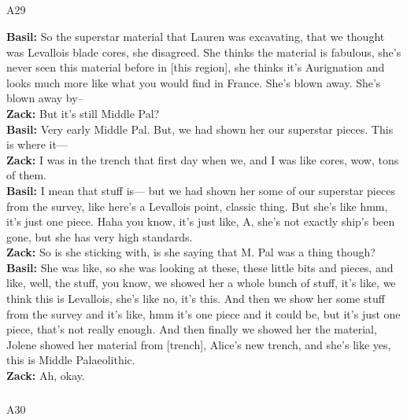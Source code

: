 \documentclass[
  canadian,
]{article}
\makeatletter
\let\oldsubparagraph\subparagraph
\renewcommand{\subparagraph}{
    \@ifstar
      \xxxSubParagraphStar
      \xxxSubParagraphNoStar
  }
\newcommand{\xxxSubParagraphStar}[1]{\oldsubparagraph*{#1}\mbox{}}
\newcommand{\xxxSubParagraphNoStar}[1]{\oldsubparagraph{#1}\mbox{}}
\makeatother
\begin{document}
\subparagraph{A29}\label{sec-A29}

\textbf{Basil:} So the superstar material that Lauren was excavating,
that we thought was Levallois blade cores, she disagreed. She thinks the
material is fabulous, she's never seen this material before in {[}this
region{]}, she thinks it's Aurignation and looks much more like what you
would find in France. She's blown away. She's blown away by--\\
\textbf{Zack:} But it's still Middle Pal?\\
\textbf{Basil:} Very early Middle Pal. But, we had shown her our
superstar pieces. This is where it---\\
\textbf{Zack:} I was in the trench that first day when we, and I was
like cores, wow, tons of them.\\
\textbf{Basil:} I mean that stuff is--- but we had shown her some of our
superstar pieces from the survey, like here's a Levallois point, classic
thing. But she's like hmm, it's just one piece. Haha you know, it's just
like, A, she's not exactly ship's been gone, but she has very high
standards.\\
\textbf{Zack:} So is she sticking with, is she saying that M. Pal was a
thing though?\\
\textbf{Basil:} She was like, so she was looking at these, these little
bits and pieces, and like, well, the stuff, you know, we showed her a
whole bunch of stuff, it's like, we think this is Levallois, she's like
no, it's this. And then we show her some stuff from the survey and it's
like, hmm it's one piece and it could be, but it's just one piece,
that's not really enough. And then finally we showed her the material,
Jolene showed her material from {[}trench{]}, Alice's new trench, and
she's like yes, this is Middle Palaeolithic.\\
\textbf{Zack:} Ah, okay.

\subparagraph{A30}\label{sec-A30}
\end{document}
